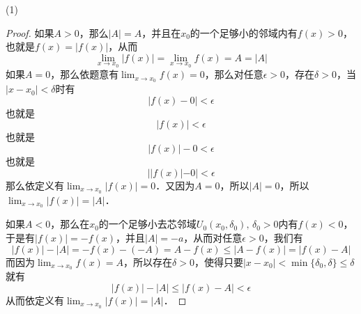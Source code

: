 (1) 
\begin{proof}
如果$A > 0$，那么$|A|=A$，并且在$x_0$的一个足够小的邻域内有$f(x) > 0$，也就是$f(x) = |f(x)|$，从而
\begin{equation}
    \lim_{x \to x_0} |f(x)| = \lim_{x \to x_0} f(x) = A = |A|
\end{equation}
如果$A = 0$，那么依题意有$\displaystyle\lim_{x \to x_0} f(x) = 0$，那么对任意$\epsilon > 0$，存在$\delta > 0$，当$|x - x_0| < \delta$时有
\begin{equation}
    |f(x) - 0 | < \epsilon
\end{equation}
也就是
\begin{equation}
    |f(x)| < \epsilon
\end{equation}
也就是
\begin{equation}
    |f(x)| - 0 < \epsilon
\end{equation}
也就是
\begin{equation}
    ||f(x)| - 0| < \epsilon
\end{equation}
那么依定义有$\displaystyle\lim_{x \to x_0} |f(x)| = 0$．又因为$A = 0$，所以$|A| = 0$，所以$\displaystyle\lim_{x \to x_0} |f(x)| = |A|$．

如果$A < 0$，那么在$x_0$的一个足够小去芯邻域$U_0(x_0, \delta_0), \, \delta_0 > 0$内有$f(x) < 0$，于是有$|f(x)|=-f(x)$，并且$|A|=-a$，从而对任意$\epsilon > 0$，我们有
\begin{equation}
    |f(x)| - |A| = -f(x) - (-A) = A - f(x) \leq |A - f(x)| = |f(x) - A| 
\end{equation}
而因为$\displaystyle\lim_{x \to x_0} f(x) = A$，所以存在$\delta > 0$，使得只要$|x-x_0|<\min\{\delta_0, \delta \} \leq \delta$就有
\begin{equation}
    |f(x)|-|A| \leq |f(x) - A| < \epsilon
\end{equation}
从而依定义有$\displaystyle\lim_{x \to x_0} |f(x)| = |A|$．
\end{proof}

